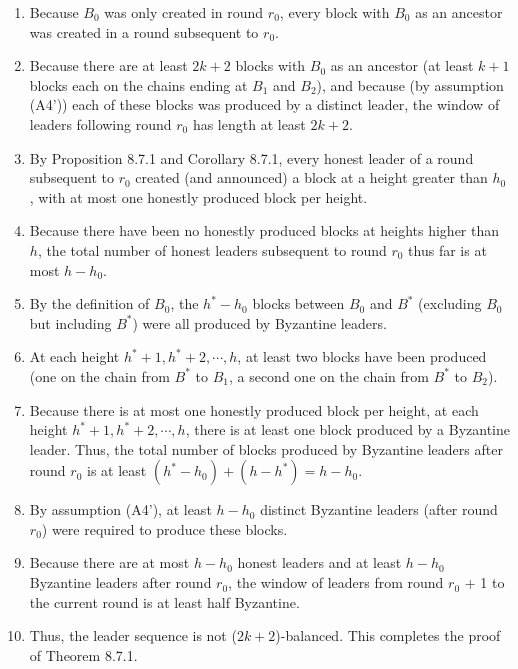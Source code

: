 \begin{enumerate}
    \item Because $B_0$ was only created in round $r_0$, every block with $B_0$ as an ancestor was
    created in a round subsequent to $r_0$.
    \item Because there are at least $2k + 2$ blocks with $B_0$ as an ancestor (at least $k + 1$ blocks
    each on the chains ending at $B_1$ and $B_2$), and because (by assumption (A4’)) each
    of these blocks was produced by a distinct leader, the window of leaders following
    round $r_0$ has length at least $2k + 2$.
    \item By Proposition 8.7.1 and Corollary 8.7.1, every honest leader of a round subsequent to $r_0$
    created (and announced) a block at a height greater than $h_0$, with at most one honestly
    produced block per height.
    \item Because there have been no honestly produced blocks at heights higher than $h$, the
    total number of honest leaders subsequent to round $r_0$ thus far is at most $h - h_0$.
    \item  By the definition of $B_0$, the $h^* - h_0$ blocks between $B_0$ and $B^*$
    (excluding $B_0$ but including $B^*$) were all produced by Byzantine leaders.
    \item At each height $h^* + 1, h^* + 2, \cdots , h$, at least two blocks have been produced (one on
    the chain from $B^*$
    to $B_1$, a second one on the chain from $B^*$
    to $B_2$).
    \item Because there is at most one honestly produced block per height, at each height $h^* +1, h^* + 2, \cdots , h$, there is at least one block produced by a Byzantine leader. Thus, the total number of blocks produced by Byzantine leaders after round $r_0$ is at least $(h^* - h_0) + (h - h^*) = h - h_0$.
    \item By assumption (A4’), at least $h - h_0$ distinct Byzantine leaders (after round $r_0$) were
    required to produce these blocks.
    \item Because there are at most $h - h_0$ honest leaders and at least $h - h_0$ Byzantine leaders
    after round $r_0$, the window of leaders from round $r_0$ + 1 to the current round is at least
    half Byzantine.
    \item Thus, the leader sequence is not ($2k + 2$)-balanced.
This completes the proof of Theorem 8.7.1.
\end{enumerate}

